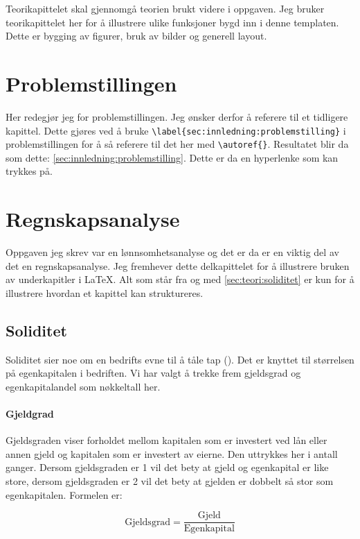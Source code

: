 
Teorikapittelet skal gjennomgå teorien brukt videre i oppgaven. Jeg bruker teorikapittelet her for å illustrere ulike funksjoner bygd inn i denne templaten. Dette er bygging av figurer, bruk av bilder og generell layout.

\section{Problemstillingen}
Her redegjør jeg for problemstillingen. Jeg ønsker derfor å referere til et tidligere kapittel. Dette gjøres ved å bruke \verb!\label{sec:innledning:problemstilling}! i problemstillingen for å så referere til det her med \verb!\autoref{}!. Resultatet blir da som dette: \autoref{sec:innledning:problemstilling}. Dette er da en hyperlenke som kan trykkes på.

\section{Regnskapsanalyse}
Oppgaven jeg skrev var en lønnsomhetsanalyse og det er da er en viktig del av det en regnskapsanalyse. Jeg fremhever dette delkapittelet for å illustrere bruken av underkapitler i \LaTeX. Alt som står fra og med \autoref{sec:teori:soliditet} er kun for å illustrere hvordan et kapittel kan struktureres.

\subsection{Soliditet}
\label{sec:teori:soliditet}
Soliditet sier noe om en bedrifts evne til å tåle tap (\cite{kristoffersen}). Det er knyttet til størrelsen på egenkapitalen i bedriften. Vi har valgt å trekke frem gjeldsgrad og egenkapitalandel som nøkkeltall her.

\paragraph{Gjeldgrad}
Gjeldsgraden viser forholdet mellom kapitalen som er investert ved lån eller annen gjeld og kapitalen som er investert av eierne. Den uttrykkes her i antall ganger. Dersom gjeldsgraden er 1 vil det bety at gjeld og egenkapital er like store, dersom gjeldsgraden er 2 vil det bety at gjelden er dobbelt så stor som egenkapitalen. Formelen er:

\begin{equation}
    \label{eq:gjeldsgrad}
    \boxed{\text{Gjeldsgrad}=\frac{\text{Gjeld}}{\text{Egenkapital}}}
\end{equation}

